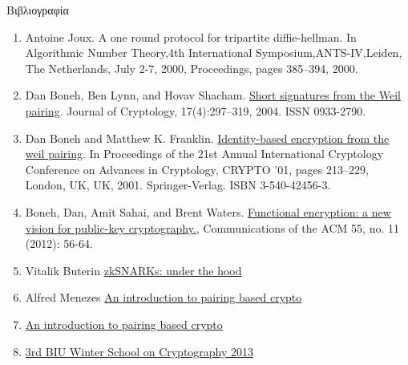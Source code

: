 \documentclass[handout]{beamer}
\begin{document}
\begin{frame}{Βιβλιογραφία}
\begin{tiny}
\begin{enumerate}
\item Antoine Joux. {A one round protocol for tripartite diffie-hellman}. In Algorithmic Number Theory,4th International Symposium,ANTS-IV,Leiden,
The Netherlands, July 2-7, 2000, Proceedings, pages 385–394, 2000.
\item Dan Boneh, Ben Lynn, and Hovav Shacham. \href{https://www.iacr.org/archive/asiacrypt2001/22480516.pdf}{Short signatures from the Weil pairing}. Journal of Cryptology, 17(4):297–319, 2004. ISSN 0933-2790. 
\item Dan Boneh and Matthew K. Franklin. \href{https://www.iacr.org/archive/crypto2001/21390212.pdf}{Identity-based encryption from the weil pairing}. In Proceedings of the 21st Annual International Cryptology Conference on Advances in Cryptology, CRYPTO ’01, pages 213–229, London, UK, UK, 2001. Springer-Verlag. ISBN 3-540-42456-3.
\item Boneh, Dan, Amit Sahai, and Brent Waters. \href{http://citeseerx.ist.psu.edu/viewdoc/download?doi=10.1.1.383.6103&rep=rep1&type=pdf}{Functional encryption: a new vision for public-key cryptography.}, Communications of the ACM 55, no. 11 (2012): 56-64.
\item Vitalik Buterin \href{https://medium.com/@VitalikButerin/zk-snarks-under-the-hood-b33151a013f6}{zkSNARKs: under the hood}
\item Alfred Menezes \href{https://www.math.uwaterloo.ca/~ajmeneze/publications/pairings.pdf}{An introduction to pairing based crypto}
\item \href{https://www.math.uwaterloo.ca/~ajmeneze/publications/pairings.pdf}{An introduction to pairing based crypto}
\item \href{https://www.youtube.com/playlist?list=PLXF_IJaFk-9C4p3b2tK7H9a9axOm3EtjA}{3rd BIU Winter School on Cryptography 2013}
\end{enumerate}
\end{tiny}
\end{frame}
\end{document}
